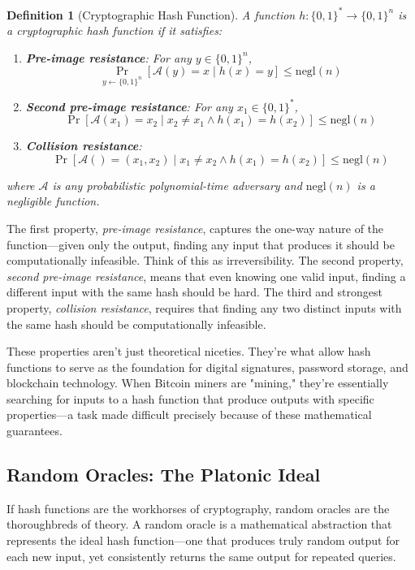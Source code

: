 \documentclass[11pt]{article}
\newtheorem{definition}{Definition}
\begin{document}
\begin{definition}[Cryptographic Hash Function]
A function $h: \{0,1\}^* \to \{0,1\}^n$ is a cryptographic hash function if it satisfies:
\begin{enumerate}
\item \textbf{Pre-image resistance}: For any $y \in \{0,1\}^n$,
$$\Pr_{y \leftarrow \{0,1\}^n}[\mathcal{A}(y) = x \mid h(x) = y] \leq \text{negl}(n)$$

\item \textbf{Second pre-image resistance}: For any $x_1 \in \{0,1\}^*$,
$$\Pr[\mathcal{A}(x_1) = x_2 \mid x_2 \neq x_1 \land h(x_1) = h(x_2)] \leq \text{negl}(n)$$

\item \textbf{Collision resistance}: 
$$\Pr[\mathcal{A}() = (x_1, x_2) \mid x_1 \neq x_2 \land h(x_1) = h(x_2)] \leq \text{negl}(n)$$
\end{enumerate}
where $\mathcal{A}$ is any probabilistic polynomial-time adversary and $\text{negl}(n)$ is a negligible function.
\end{definition}

The first property, \emph{pre-image resistance}, captures the one-way nature of the function---given only the output, finding any input that produces it should be computationally infeasible. Think of this as irreversibility. The second property, \emph{second pre-image resistance}, means that even knowing one valid input, finding a different input with the same hash should be hard. The third and strongest property, \emph{collision resistance}, requires that finding any two distinct inputs with the same hash should be computationally infeasible.

These properties aren't just theoretical niceties. They're what allow hash functions to serve as the foundation for digital signatures, password storage, and blockchain technology. When Bitcoin miners are "mining," they're essentially searching for inputs to a hash function that produce outputs with specific properties---a task made difficult precisely because of these mathematical guarantees.

\subsection{Random Oracles: The Platonic Ideal}

If hash functions are the workhorses of cryptography, random oracles are the thoroughbreds of theory. A random oracle is a mathematical abstraction that represents the ideal hash function---one that produces truly random output for each new input, yet consistently returns the same output for repeated queries.
\end{document}
